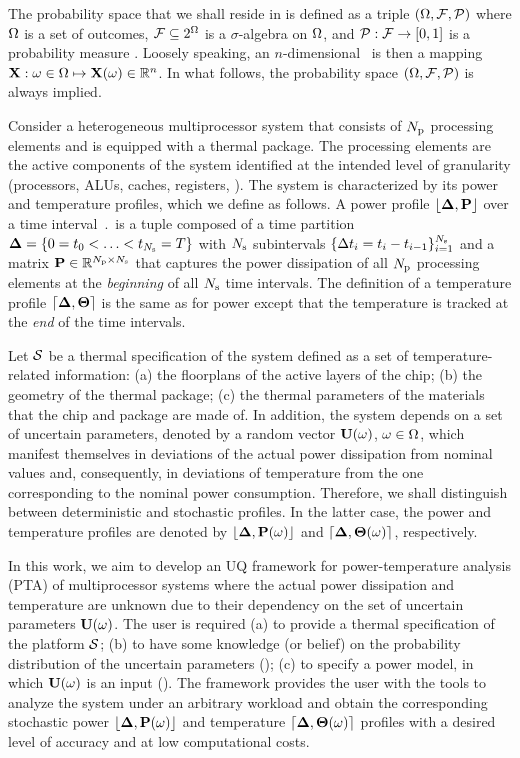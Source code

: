 The probability space that we shall reside in is defined as a triple $(\Omega, \mathcal{F}, \mathcal{P})$ where $\Omega$ is a set of outcomes, $\mathcal{F} \subseteq 2^\Omega$ is a $\sigma$-algebra on $\Omega$, and $\mathcal{P}: \mathcal{F} \to [0, 1]$ is a probability measure \cite{maitre2010}. Loosely speaking, an $n$-dimensional \rv\ is then a mapping $\mathbf{X}: \omega \in \Omega \mapsto \mathbf{X}(\omega) \in \mathbb{R}^n$. In what follows, the probability space $(\Omega, \mathcal{F}, \mathcal{P})$ is always implied.

Consider a heterogeneous multiprocessor system that consists of ${N_\text{p}}$ processing elements and is equipped with a thermal package. The processing elements are the active components of the system identified at the intended level of granularity (processors, ALUs, caches, registers, \etc). The system is characterized by its power and temperature profiles, which we define as follows. A power profile $\profP$ over a time interval $\period$ is a tuple composed of a time partition $\boldsymbol{\Delta} = \{ 0 = t_0 < \dotsc < t_{N_\text{s}} = T \}$ with $N_\text{s}$ subintervals $\{ \Delta t_i = t_i - t_{i - 1} \}_{i = 1}^{N_\text{s}}$ and a matrix $\mP \in \real^{\cores \times \steps}$ that captures the power dissipation of all ${N_\text{p}}$ processing elements at the \emph{beginning} of all $N_\text{s}$ time intervals. The definition of a temperature profile $\profT$ is the same as for power except that the temperature is tracked at the \emph{end} of the time intervals.

Let $\mathcal{S}$ be a thermal specification of the system defined as a set of temperature-related information: (a) the floorplans of the active layers of the chip; (b) the geometry of the thermal package; (c) the thermal parameters of the materials that the chip and package are made of. In addition, the system depends on a set of uncertain parameters, denoted by a random vector $\mathbf{U}(\omega)$, $\omega \in \Omega$, which manifest themselves in deviations of the actual power dissipation from nominal values and, consequently, in deviations of temperature from the one corresponding to the nominal power consumption. Therefore, we shall distinguish between deterministic and stochastic profiles. In the latter case, the power and temperature profiles are denoted by $\profP{\o}$ and $\profT{\o}$, respectively.

In this work, we aim to develop an UQ framework for power-temperature analysis (PTA) of multiprocessor systems where the actual power dissipation and temperature are unknown due to their dependency on the set of uncertain parameters $\mathbf{U}(\omega)$. The user is required (a) to provide a thermal specification of the platform $\mathcal{S}$; (b) to have some knowledge (or belief) on the probability distribution of the uncertain parameters (); (c) to specify a power model, in which $\mathbf{U}(\omega)$ is an input (). The framework provides the user with the tools to analyze the system under an arbitrary workload and obtain the corresponding stochastic power $\profP{\o}$ and temperature $\profT{\o}$ profiles with a desired level of accuracy and at low computational costs.

